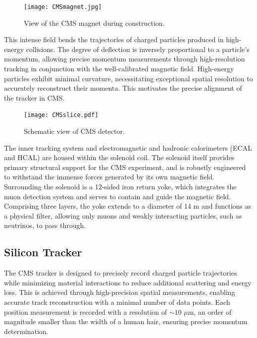 \begin{figure}[!ht]
    \begin{center}
        \texttt{[image: CMSmagnet.jpg]}
        \caption{View of the CMS magnet during construction.}
        \label{fig:CMSmagnet}
    \end{center}
\end{figure}

This intense field bends the trajectories of charged particles produced in high-energy collisions. The degree of deflection is inversely proportional to a particle’s momentum, allowing precise momentum measurements through high-resolution tracking in conjunction with the well-calibrated magnetic field. High-energy particles exhibit minimal curvature, necessitating exceptional spatial resolution to accurately reconstruct their momenta. This motivates the precise alignment of the tracker in CMS. 

\begin{figure}[!ht]
    \begin{center}
        \texttt{[image: CMSslice.pdf]}
        \caption{Schematic view of CMS detector.}
        \label{fig:cmscutaway2}
    \end{center}
\end{figure}

The inner tracking system and electromagnetic and hadronic calorimeters (ECAL and HCAL) are housed within the solenoid coil. The solenoid itself provides primary structural support for the CMS experiment, and is robustly engineered to withstand the immense forces generated by its own magnetic field. Surrounding the solenoid is a 12-sided iron return yoke, which integrates the muon detection system and serves to contain and guide the magnetic field. Comprising three layers, the yoke extends to a diameter of 14 m and functions as a physical filter, allowing only muons and weakly interacting particles, such as neutrinos, to pass through. 

\subsection{Silicon Tracker}

The CMS tracker is designed to precisely record charged particle trajectories while minimizing material interactions to reduce additional scattering and energy loss. This is achieved through high-precision spatial measurements, enabling accurate track reconstruction with a minimal number of data points. Each position measurement is recorded with a resolution of $\sim10$ $\mu$m, an order of magnitude smaller than the width of a human hair, ensuring precise momentum determination.

